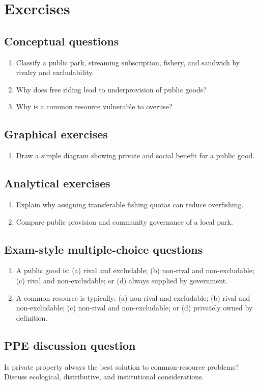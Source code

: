 \section*{Exercises}

\subsection*{Conceptual questions}
\begin{enumerate}[label=\arabic*.]
  \item Classify a public park, streaming subscription, fishery, and sandwich by rivalry and excludability.
  \item Why does free riding lead to underprovision of public goods?
  \item Why is a common resource vulnerable to overuse?
\end{enumerate}

\subsection*{Graphical exercises}
\begin{enumerate}[resume,label=\arabic*.]
  \item Draw a simple diagram showing private and social benefit for a public good.
\end{enumerate}

\subsection*{Analytical exercises}
\begin{enumerate}[resume,label=\arabic*.]
  \item Explain why assigning transferable fishing quotas can reduce overfishing.
  \item Compare public provision and community governance of a local park.
\end{enumerate}

\subsection*{Exam-style multiple-choice questions}
\begin{enumerate}[resume,label=\arabic*.]
  \item A public good is: (a) rival and excludable; (b) non-rival and non-excludable; (c) rival and non-excludable; or (d) always supplied by government.
  \item A common resource is typically: (a) non-rival and excludable; (b) rival and non-excludable; (c) non-rival and non-excludable; or (d) privately owned by definition.
\end{enumerate}

\subsection*{PPE discussion question}

\noindent Is private property always the best solution to common-resource problems? Discuss ecological, distributive, and institutional considerations.
